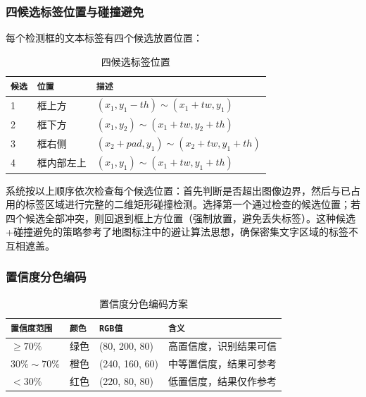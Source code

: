 \documentclass[12pt,hyperref,a4paper,UTF8]{ctexart}
\begin{document}
\subsubsection{四候选标签位置与碰撞避免}

每个检测框的文本标签有四个候选放置位置：

\begin{table}[!htbp]
    \centering
    \begin{tabular}{l|l|l}
        \hline
        \texttt{候选} & \texttt{位置} & \texttt{描述} \\
        \hline
        1 & 框上方 & $(x_1, y_1-th) \sim (x_1+tw, y_1)$ \\
        2 & 框下方 & $(x_1, y_2) \sim (x_1+tw, y_2+th)$ \\
        3 & 框右侧 & $(x_2+pad, y_1) \sim (x_2+tw, y_1+th)$ \\
        4 & 框内部左上 & $(x_1, y_1) \sim (x_1+tw, y_1+th)$ \\
        \hline
    \end{tabular}
    \caption{四候选标签位置}
    \label{tab:candidates}
\end{table}

系统按以上顺序依次检查每个候选位置：首先判断是否超出图像边界，然后与已占用的标签区域进行完整的二维矩形碰撞检测。选择第一个通过检查的候选位置；若四个候选全部冲突，则回退到框上方位置（强制放置，避免丢失标签）。这种候选+碰撞避免的策略参考了地图标注中的避让算法思想，确保密集文字区域的标签不互相遮盖。

\subsubsection{置信度分色编码}

\begin{table}[!htbp]
    \centering
    \begin{tabular}{l|l|l|l}
        \hline
        \texttt{置信度范围} & \texttt{颜色} & \texttt{RGB值} & \texttt{含义} \\
        \hline
        $\geq 70\%$ & 绿色 & (80, 200, 80) & 高置信度，识别结果可信 \\
        $30\% \sim 70\%$ & 橙色 & (240, 160, 60) & 中等置信度，结果可参考 \\
        $< 30\%$ & 红色 & (220, 80, 80) & 低置信度，结果仅作参考 \\
        \hline
    \end{tabular}
    \caption{置信度分色编码方案}
    \label{tab:color_code}
\end{table}
\end{document}
